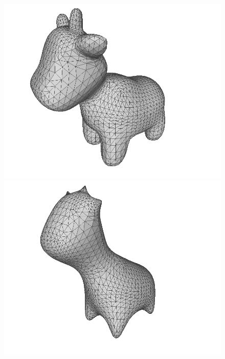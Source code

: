 \documentclass[11pt]{amsart}
\begin{document}
\begin{figure}[H]
\begin{center}
\begin{minipage}[!h]{.28\textwidth}
\centering
\includegraphics[width=\textwidth]{spot}
\end{minipage}%
\hfill
\begin{minipage}[!h]{0.28\textwidth}
\centering
\includegraphics[width=\textwidth]{spotMCF1}
\end{minipage}%
\hfill
\begin{minipage}[!h]{0.28\textwidth}
\centering

\end{minipage}
\end{center}
\end{figure}
\end{document}
